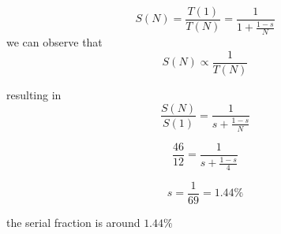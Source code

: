 \documentclass{article}
\begin{document}
\begin{equation}
    S(N)=\frac{T(1)}{T(N)}=\frac{1}{1+\frac{1-s}{N}}
\end{equation}
we can observe that
\begin{equation}
    S(N) \propto \frac{1}{T(N)}
\end{equation}

resulting in
\begin{equation}
    \frac{S(N)}{S(1)}=\frac{1}{s+\frac{1-s}{N}}
\end{equation}

\[
\frac{46}{12}=\frac{1}{s+\frac{1-s}{4}}
\]

\[ 
s = \frac{1}{69} = 1.44\%
\]

the serial fraction is around $1.44\%$ 
\end{document}
